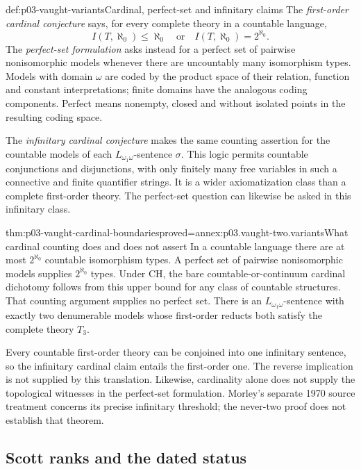 \begin{hbdefinition}{def:p03-vaught-variants}{Cardinal, perfect-set and infinitary claims}
The \emph{first-order cardinal conjecture} says, for every complete theory
in a countable language,
\[
 I(T,\aleph_0)\leq\aleph_0\quad\text{or}\quad
 I(T,\aleph_0)=2^{\aleph_0}.
\]
The \emph{perfect-set formulation} asks instead for a perfect set of
pairwise nonisomorphic models whenever there are uncountably many
isomorphism types. Models with domain \(\omega\) are coded by the product
space of their relation, function and constant interpretations; finite
domains have the analogous coding components. Perfect means nonempty,
closed and without isolated points in the resulting coding space.

The \emph{infinitary cardinal conjecture} makes the same counting assertion
for the countable models of each \(L_{\omega_1\omega}\)-sentence
\(\sigma\). This logic permits countable conjunctions and disjunctions,
with only finitely many free variables in such a connective and finite
quantifier strings. It is a wider axiomatization class than a complete
first-order theory. The perfect-set question can likewise be asked in this
infinitary class.
\end{hbdefinition}

\begin{hblemma}{thm:p03-vaught-cardinal-boundaries}{proved=annex:p03.vaught-two.variants}{What cardinal counting does and does not assert}
In a countable language there are at most \(2^{\aleph_0}\) countable
isomorphism types. A perfect set of pairwise nonisomorphic models supplies
\(2^{\aleph_0}\) types. Under CH, the bare countable-or-continuum cardinal
dichotomy follows from this upper bound for any class of countable
structures. That counting argument supplies no perfect set.
There is an \(L_{\omega_1\omega}\)-sentence with exactly two denumerable
models whose first-order reducts both satisfy the complete theory \(T_3\).
\end{hblemma}

Every countable first-order theory can be conjoined into one infinitary
sentence, so the infinitary cardinal claim entails the first-order one.
The reverse implication is not supplied by this translation. Likewise,
cardinality alone does not supply the topological witnesses in the perfect-set
formulation. Morley's separate 1970 source treatment concerns its precise
infinitary threshold; the never-two proof does not establish that theorem.

\subsection{Scott ranks and the dated status}
\label{sec:p03-vaught-status-2026}

